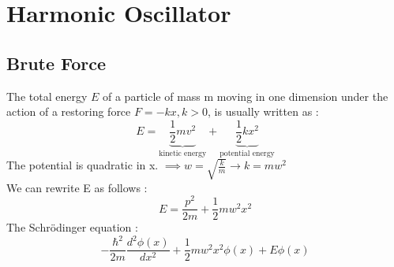 \documentclass[12pt,oneside]{book}
\begin{document}
\section{Harmonic Oscillator}
\subsection{Brute Force}
The total energy $E$ of a particle of mass m moving in one dimension under the action of a restoring force $F = -kx,k>0$, is usually written as :
\[E = \underbrace{\frac{1}{2}mv^2}_\text{kinetic energy} + \underbrace{\frac{1}{2}kx^2}_\text{potential energy}\]
The potential is quadratic in x. $\implies w = \sqrt{\frac{k}{m}} \to k = mw^2$\\
We can rewrite E as follows :
\[E = \frac{p^2}{2m} + \frac{1}{2}mw^2x^2\]
The Schrödinger equation :
\[ -\frac{\hbar^2}{2m}\frac{d^2\phi(x)}{dx^2}+\frac{1}{2}mw^2x^2\phi(x) + E\phi(x) \]
\end{document}
